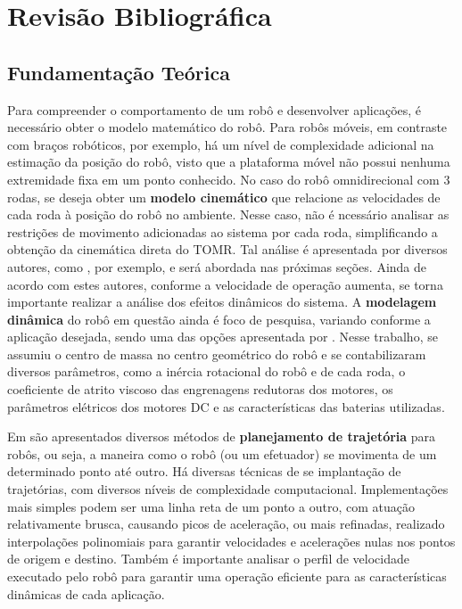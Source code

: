 \section{Revisão Bibliográfica}
\label{sec:revbib}

\subsection{Fundamentação Teórica}

Para compreender o comportamento de um robô e desenvolver aplicações, é necessário obter o modelo matemático do robô. Para robôs móveis, em contraste com braços robóticos, por exemplo, há um nível de complexidade adicional na estimação da posição do robô, visto que a plataforma móvel não possui nenhuma extremidade fixa em um ponto conhecido. No caso do robô omnidirecional com 3 rodas, se deseja obter um \textbf{modelo cinemático} que relacione as velocidades de cada roda à posição do robô no ambiente. Nesse caso, não é ncessário analisar as restrições de movimento adicionadas ao sistema por cada roda, simplificando a obtenção da cinemática direta do TOMR. Tal análise é apresentada por diversos autores, como \cite{siegwart2011introduction}, por exemplo, e será abordada nas próximas seções. Ainda de acordo com estes autores, conforme a velocidade de operação aumenta, se torna importante realizar a análise dos efeitos dinâmicos do sistema. A \textbf{modelagem dinâmica} do robô em questão ainda é foco de pesquisa, variando conforme a aplicação desejada, sendo uma das opções apresentada por \cite{kim2014minenergy}. Nesse trabalho, se assumiu o centro de massa no centro geométrico do robô e se contabilizaram diversos parâmetros, como a inércia rotacional do robô e de cada roda, o coeficiente de atrito viscoso das engrenagens redutoras dos motores, os parâmetros elétricos dos motores DC e as características das baterias utilizadas.

Em \cite{lynch2017modern} são apresentados diversos métodos de \textbf{planejamento de trajetória} para robôs, ou seja, a maneira como o robô (ou um efetuador) se movimenta de um determinado ponto até outro. Há diversas técnicas de se implantação de trajetórias, com diversos níveis de complexidade computacional. Implementações mais simples podem ser uma linha reta de um ponto a outro, com atuação relativamente brusca, causando picos de aceleração, ou mais refinadas, realizado interpolações polinomiais para garantir velocidades e acelerações nulas nos pontos de origem e destino. Também é importante analisar o perfil de velocidade executado pelo robô para garantir uma operação eficiente para as características dinâmicas de cada aplicação.

